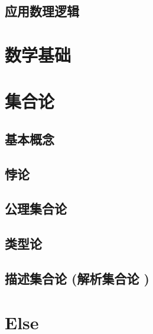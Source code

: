 \documentclass[UTF8]{../09-Mathematics}
\begin{document}
\section{应用数理逻辑}



\chapter{数学基础}


\chapter{集合论}
    \section{基本概念}
    \section{悖论}
    \section{公理集合论}
    \section{类型论}
    \section{描述集合论 (解析集合论 )}



\chapter{Else}
\end{document}
